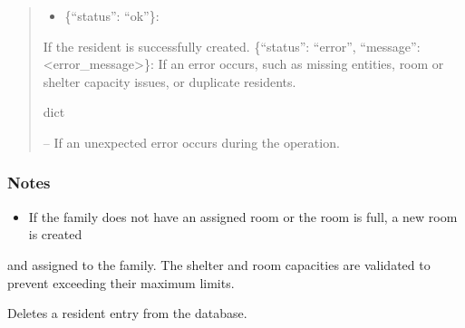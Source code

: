 \documentclass[letterpaper,10pt,english]{sphinxmanual}
\begin{document}
\begin{fulllineitems}
\begin{fulllineitems}
\begin{quote}
\begin{description}
\begin{itemize}
\end{itemize}

\sphinxAtStartPar
\begin{description}
\begin{itemize}
\item {} 
\sphinxAtStartPar
\{“status”: “ok”\}:

\end{itemize}

\sphinxAtStartPar
If the resident is successfully created.
\sphinxhyphen{} \{“status”: “error”, “message”: <error\_message>\}:
If an error occurs, such as missing entities, room or shelter capacity issues,
or duplicate residents.

\end{description}


\sphinxAtStartPar
dict

\sphinxAtStartPar
{} – If an unexpected error occurs during the operation.

\end{description}\end{quote}
\subsubsection*{Notes}
\begin{itemize}
\item {} 
\sphinxAtStartPar
If the family does not have an assigned room or the room is full, a new room is created

\end{itemize}

\sphinxAtStartPar
and assigned to the family.
\sphinxhyphen{} The shelter and room capacities are validated to prevent exceeding their maximum limits.

\end{fulllineitems}


\begin{fulllineitems}
\label{\detokenize{app.controllers:app.controllers.resident_controller.ResidentController.delete_resident}}
\pysigstartsignatures
\pysiglinewithargsret
{}
{\sphinxparamcomma {}}
{}
\pysigstopsignatures
\sphinxAtStartPar
Deletes a resident entry from the database.


\end{fulllineitems}
\end{fulllineitems}
\end{document}
